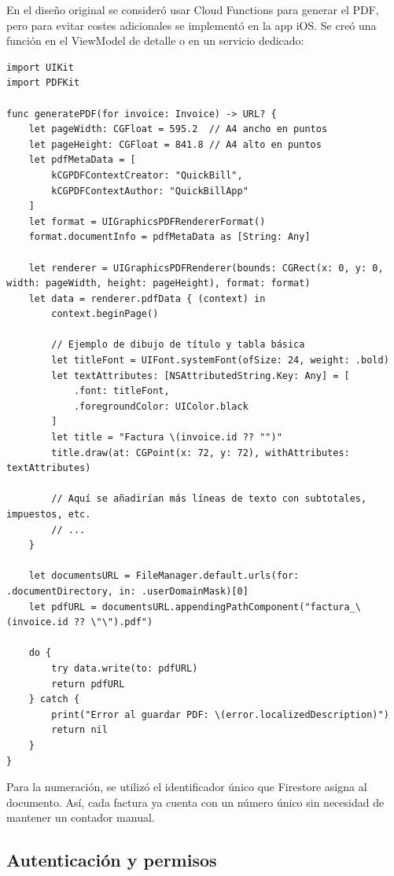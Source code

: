 \begin{large}

En el diseño original se consideró usar Cloud Functions para generar el PDF, pero para evitar costes adicionales se implementó en la app iOS. Se creó una función en el ViewModel de detalle o en un servicio dedicado:

\begin{verbatim}
import UIKit
import PDFKit

func generatePDF(for invoice: Invoice) -> URL? {
    let pageWidth: CGFloat = 595.2  // A4 ancho en puntos
    let pageHeight: CGFloat = 841.8 // A4 alto en puntos
    let pdfMetaData = [
        kCGPDFContextCreator: "QuickBill",
        kCGPDFContextAuthor: "QuickBillApp"
    ]
    let format = UIGraphicsPDFRendererFormat()
    format.documentInfo = pdfMetaData as [String: Any]

    let renderer = UIGraphicsPDFRenderer(bounds: CGRect(x: 0, y: 0, width: pageWidth, height: pageHeight), format: format)
    let data = renderer.pdfData { (context) in
        context.beginPage()
        
        // Ejemplo de dibujo de título y tabla básica
        let titleFont = UIFont.systemFont(ofSize: 24, weight: .bold)
        let textAttributes: [NSAttributedString.Key: Any] = [
            .font: titleFont,
            .foregroundColor: UIColor.black
        ]
        let title = "Factura \(invoice.id ?? "")"
        title.draw(at: CGPoint(x: 72, y: 72), withAttributes: textAttributes)
        
        // Aquí se añadirían más líneas de texto con subtotales, impuestos, etc.
        // ...
    }

    let documentsURL = FileManager.default.urls(for: .documentDirectory, in: .userDomainMask)[0]
    let pdfURL = documentsURL.appendingPathComponent("factura_\(invoice.id ?? \"\").pdf")
    
    do {
        try data.write(to: pdfURL)
        return pdfURL
    } catch {
        print("Error al guardar PDF: \(error.localizedDescription)")
        return nil
    }
}
\end{verbatim}

Para la numeración, se utilizó el identificador único que Firestore asigna al documento. Así, cada factura ya cuenta con un número único sin necesidad de mantener un contador manual.

\end{large}

\subsection{Autenticación y permisos}

